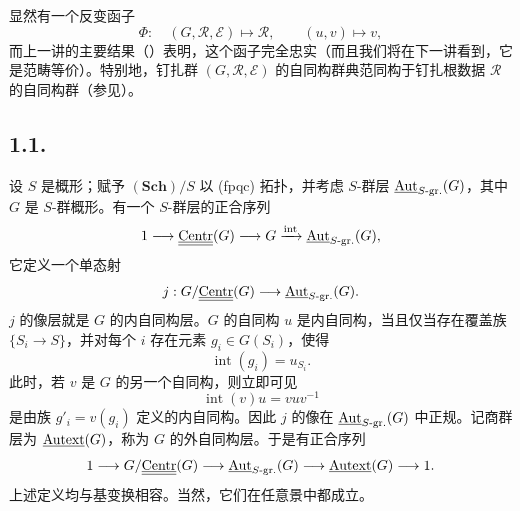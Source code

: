 显然有一个反变函子
\[
  \Phi:\quad
  (G,\mathscr R,\mathcal E)\longmapsto\mathscr R,
  \qquad
  (u,v)\longmapsto v,
\]
而上一讲的主要结果（）表明，这个函子完全忠实（而且我们将在下一讲看到，它是范畴等价）。特别地，钉扎群 \((G,\mathscr R,\mathcal E)\) 的自同构群典范同构于钉扎根数据 \(\mathscr R\) 的自同构群（参见）。

\subsection*{1.1.}
设 \(S\) 是概形；赋予 \((\mathbf{Sch})/S\) 以 \textup{(fpqc)} 拓扑，并考虑 \(S\)-群层 \(\underline{\operatorname{Aut}}_{S\text{-}\mathrm{gr.}}(G)\)，其中 \(G\) 是 \(S\)-群概形。有一个 \(S\)-群层的正合序列
\[
  1\longrightarrow \underline{\underline{\operatorname{Centr}}}(G)
  \longrightarrow G
  \xrightarrow{\mathrm{int}}
  \underline{\operatorname{Aut}}_{S\text{-}\mathrm{gr.}}(G),
\]
它定义一个单态射
\[
  j:G/\underline{\underline{\operatorname{Centr}}}(G)
  \longrightarrow \underline{\operatorname{Aut}}_{S\text{-}\mathrm{gr.}}(G).
\]
\(j\) 的像层就是 \(G\) 的内自同构层。\(G\) 的自同构 \(u\) 是内自同构，当且仅当存在覆盖族 \(\{S_i\to S\}\)，并对每个 \(i\) 存在元素 \(g_i\in G(S_i)\)，使得
\[
  \operatorname{int}(g_i)=u_{S_i}.
\]
此时，若 \(v\) 是 \(G\) 的另一个自同构，则立即可见
\[
  \operatorname{int}(v)u=vuv^{-1}
\]
是由族 \(g'_i=v(g_i)\) 定义的内自同构。因此 \(j\) 的像在 \(\underline{\operatorname{Aut}}_{S\text{-}\mathrm{gr.}}(G)\) 中正规。记商群层为 \(\underline{\operatorname{Autext}}(G)\)，称为 \(G\) 的外自同构层。于是有正合序列
\[
  1\longrightarrow G/\underline{\underline{\operatorname{Centr}}}(G)
  \longrightarrow \underline{\operatorname{Aut}}_{S\text{-}\mathrm{gr.}}(G)
  \longrightarrow \underline{\operatorname{Autext}}(G)
  \longrightarrow 1.
\]
上述定义均与基变换相容。当然，它们在任意景中都成立。

